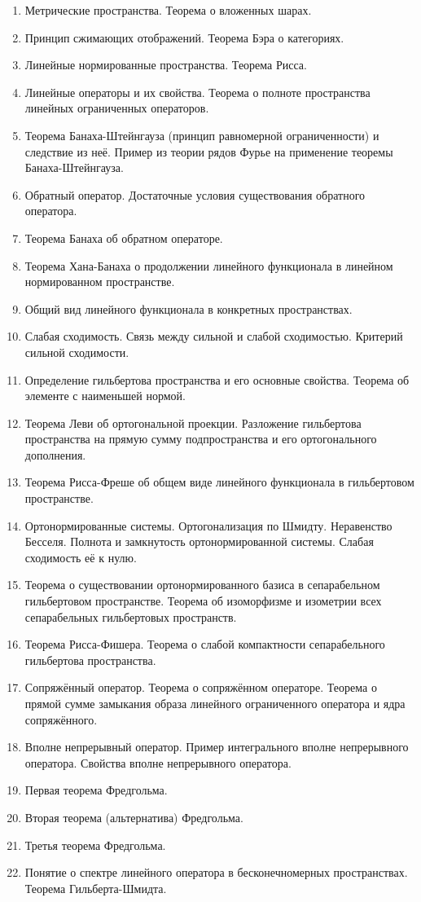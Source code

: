\documentclass[10pt]{extarticle}
\begin{document}
\begin{enumerate}
		\item Метрические пространства. Теорема о вложенных шарах.
		\item Принцип сжимающих отображений. Теорема Бэра о категориях.
		\item Линейные нормированные пространства. Теорема Рисса.
		\item Линейные операторы и их свойства. Теорема о полноте пространства линейных ограниченных операторов.
		\item Теорема Банаха-Штейнгауза (принцип равномерной ограниченности) и следствие из неё. Пример из теории рядов Фурье на применение теоремы Банаха-Штейнгауза.
		\item Обратный оператор. Достаточные условия существования обратного оператора.
		\item Теорема Банаха об обратном операторе.
		\item Теорема Хана-Банаха о продолжении линейного функционала в линейном нормированном пространстве.
		\item Общий вид линейного функционала в конкретных пространствах.
		\item Слабая сходимость. Связь между сильной и слабой сходимостью. Критерий сильной сходимости.
		\item Определение гильбертова пространства и его основные свойства. Теорема об элементе с наименьшей нормой.
		\item Теорема Леви об ортогональной проекции. Разложение гильбертова пространства на прямую сумму подпространства и его ортогонального дополнения.
		\item Теорема Рисса-Фреше об общем виде линейного функционала в гильбертовом пространстве.
		\item Ортонормированные системы. Ортогонализация по Шмидту. Неравенство Бесселя. Полнота и замкнутость ортонормированной системы. Слабая сходимость её к нулю.
		\item Теорема о существовании ортонормированного базиса в сепарабельном гильбертовом пространстве. Теорема об изоморфизме и изометрии всех сепарабельных гильбертовых пространств.
		\item Теорема Рисса-Фишера. Теорема о слабой компактности сепарабельного гильбертова пространства. 
		\item Сопряжённый оператор. Теорема о сопряжённом операторе. Теорема о прямой сумме замыкания образа линейного ограниченного оператора и ядра сопряжённого.
		\item Вполне непрерывный оператор. Пример интегрального вполне непрерывного оператора. Свойства вполне непрерывного оператора.
		\item Первая теорема Фредгольма.
		\item Вторая теорема (альтернатива) Фредгольма.
		\item Третья теорема Фредгольма.
		\item Понятие о спектре линейного оператора в бесконечномерных пространствах. Теорема Гильберта-Шмидта.
	\end{enumerate}
\end{document}
